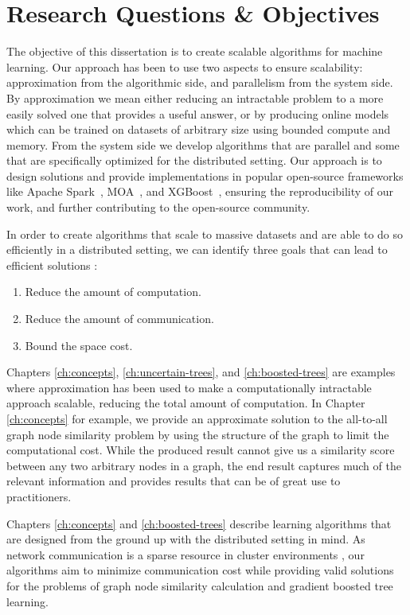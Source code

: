 \section{Research Questions \& Objectives}

The objective of this dissertation is to create scalable algorithms for machine
learning. Our approach has been to use two aspects to ensure scalability:
approximation from the algorithmic side, and parallelism from the system
side. By approximation we mean either reducing an intractable problem
to a more easily solved one that provides a useful answer, or by producing
online models which can be trained on datasets of arbitrary size using bounded
compute and memory. From the system side we develop algorithms that are parallel
and some that are specifically optimized for the distributed setting.
Our approach is to design solutions and provide implementations
in popular open-source frameworks like Apache Spark~\cite{spark},
MOA~\cite{samoa}, and XGBoost~\cite{xgboost}, ensuring the reproducibility
of our work, and further contributing to the open-source community.

In order to create algorithms that scale to massive datasets and are able to
do so efficiently in a distributed setting, we can identify three goals that can
lead to efficient solutions \cite{vasia-thesis}:

\begin{enumerate}
	\item Reduce the amount of computation.
	\item Reduce the amount of communication.
	\item Bound the space cost.
\end{enumerate}

Chapters \ref{ch:concepts}, \ref{ch:uncertain-trees}, and \ref{ch:boosted-trees}
are examples where approximation has been used to make a computationally intractable
approach scalable, reducing the total amount of computation.
In Chapter \ref{ch:concepts} for example, we provide an approximate solution
to the all-to-all graph node similarity problem by using the structure of the
graph to limit the computational cost. While the produced result cannot give
us a similarity score between any two arbitrary nodes in a graph, the end result captures
much of the relevant information and provides results that can be of great use
to practitioners.

Chapters \ref{ch:concepts} and \ref{ch:boosted-trees} describe learning algorithms that
are designed from the ground up with the distributed setting in mind. As network
communication is a sparse resource in cluster environments \cite{optimization-communication-complexity},
our algorithms aim to minimize communication cost while providing valid
solutions for the problems of graph node similarity calculation and gradient
boosted tree learning.

